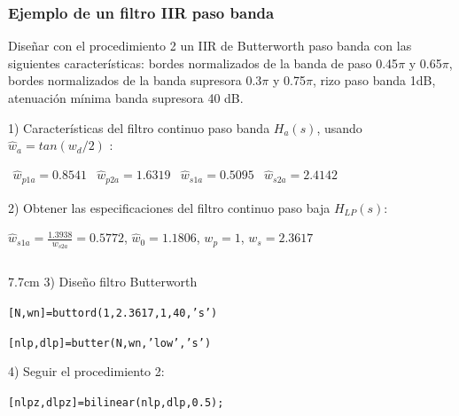 \documentclass[handout]{beamer}
\numberwithin{section}{part}
\begin{document}
\begin{frame}
\frametitle{Ejemplo de un filtro  IIR paso banda}
\footnotesize

\footnotesize
\color{olivegreen} Diseñar con el procedimiento 2 un IIR de Butterworth paso banda con las siguientes características: bordes normalizados de la banda de paso 0.45$\pi$ y 0.65$\pi$, bordes normalizados de la banda supresora 0.3$\pi$ y 0.75$\pi$, rizo paso banda 1dB, atenuación mínima banda supresora 40 dB.
\color{gray}
\vspace{0.1cm}

1)  Características del filtro continuo paso banda $H_a(s)$, usando $\hat w_{a}=tan(w_{d}/2)$  :

$\begin{array}{llll}\hat w_{p1a}=0.8541 &\hat w_{p2a}=1.6319  & \hat w_{s1a}=0.5095 & \hat w_{s2a}=2.4142
\end{array}$

\vspace{0.1cm}

2) Obtener las especificaciones del filtro continuo paso baja $H_{LP}(s)$:

\vspace{0.1cm}

\hspace{0.25cm}$\hat w_{s1a}=\frac{1.3938}{w_{s2a}}=0.5772$, $\hat w_0=1.1806$, $w_p=1$, $w_{s}=2.3617$


\vspace{0.1cm}

\begin{columns}[T]
 \hspace{0.2cm}\begin{column}{7.7cm}
3) Diseño filtro Butterworth

\vspace{0.1cm}

\hspace{0.25cm}\texttt{[N,wn]=buttord(1,2.3617,1,40,'s')}

\hspace{0.25cm}\texttt{[nlp,dlp]=butter(N,wn,'low','s')}

\vspace{0.1cm}

 4) Seguir el procedimiento 2:

 \vspace{0.1cm}

  \hspace{0.25cm}\texttt{[nlpz,dlpz]=bilinear(nlp,dlp,0.5);}

\end{column}
\end{columns}
\end{frame}
\end{document}
